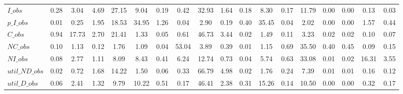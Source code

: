 \begin{center}
\begin{longtable}{lccccccccccccccccc}
$I\_obs         $	 & 	            0.28	 & 	            3.04	 & 	            4.69	 & 	           27.15	 & 	            9.04	 & 	            0.19	 & 	            0.42	 & 	           32.93	 & 	            1.64	 & 	            0.18	 & 	            8.30	 & 	            0.17	 & 	           11.79	 & 	            0.00	 & 	            0.00	 & 	            0.13	 & 	            0.03 \\ 
$p\_I\_obs      $	 & 	            0.01	 & 	            0.25	 & 	            1.95	 & 	           18.53	 & 	           34.95	 & 	            1.26	 & 	            0.04	 & 	            2.90	 & 	            0.19	 & 	            0.40	 & 	           35.45	 & 	            0.04	 & 	            2.02	 & 	            0.00	 & 	            0.00	 & 	            1.57	 & 	            0.44 \\ 
$C\_obs         $	 & 	            0.94	 & 	           17.73	 & 	            2.70	 & 	           21.41	 & 	            1.33	 & 	            0.05	 & 	            0.61	 & 	           46.73	 & 	            3.44	 & 	            0.02	 & 	            1.49	 & 	            0.11	 & 	            3.23	 & 	            0.02	 & 	            0.02	 & 	            0.10	 & 	            0.07 \\ 
$NC\_obs        $	 & 	            0.10	 & 	            1.13	 & 	            0.12	 & 	            1.76	 & 	            1.09	 & 	            0.04	 & 	           53.04	 & 	            3.89	 & 	            0.39	 & 	            0.01	 & 	            1.15	 & 	            0.69	 & 	           35.50	 & 	            0.40	 & 	            0.45	 & 	            0.09	 & 	            0.15 \\ 
$NI\_obs        $	 & 	            0.08	 & 	            2.77	 & 	            1.11	 & 	            8.09	 & 	            8.43	 & 	            0.41	 & 	            6.24	 & 	           12.74	 & 	            0.73	 & 	            0.04	 & 	            5.74	 & 	            0.63	 & 	           33.08	 & 	            0.01	 & 	            0.02	 & 	           16.31	 & 	            3.55 \\ 
$util\_ND\_obs  $	 & 	            0.02	 & 	            0.72	 & 	            1.68	 & 	           14.22	 & 	            1.50	 & 	            0.06	 & 	            0.33	 & 	           66.79	 & 	            4.98	 & 	            0.02	 & 	            1.76	 & 	            0.24	 & 	            7.39	 & 	            0.01	 & 	            0.01	 & 	            0.16	 & 	            0.12 \\ 
$util\_D\_obs   $	 & 	            0.06	 & 	            2.41	 & 	            1.32	 & 	            9.79	 & 	           10.22	 & 	            0.51	 & 	            0.17	 & 	           46.41	 & 	            2.38	 & 	            0.31	 & 	           15.26	 & 	            0.14	 & 	           10.50	 & 	            0.00	 & 	            0.00	 & 	            0.32	 & 	            0.17 \\ 

\end{longtable}
\end{center}
